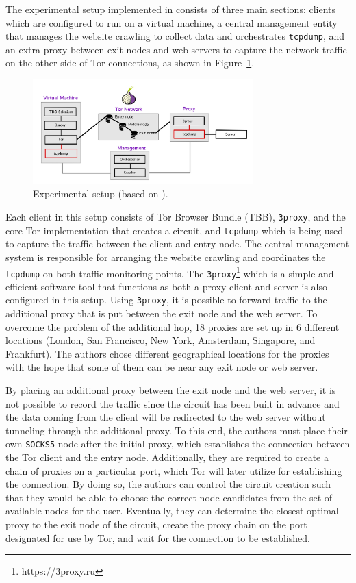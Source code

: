 \documentclass[sigconf]{acmart}
\begin{document}
The experimental setup implemented in \cite{RimmerV} consists of three main sections: clients which are configured to run on a virtual machine, a central management entity that manages the website crawling to collect data and orchestrates \texttt{tcpdump}, and an extra proxy between exit nodes and web servers to capture the network traffic on the other side of Tor connections, as shown in Figure~\ref{fig:5}.

\begin{figure}[h]
  \centering
  \includegraphics[width=8.5cm]{Figure_5.jpg}
 \caption{\textmd{Experimental setup (based on \cite{RimmerV}).}}
 \label{fig:5}
\end{figure}

Each client in this setup consists of Tor Browser Bundle (TBB), \texttt{3proxy}, and the core Tor implementation that creates a circuit, and \texttt{tcpdump} which is being used to capture the traffic between the client and entry node. The central management system is responsible for arranging the website crawling and coordinates the \texttt{tcpdump} on both traffic monitoring points. The \texttt{3proxy}\footnote{https://3proxy.ru} which is a simple and efficient software tool that functions as both a proxy client and server is also configured in this setup. Using \texttt{3proxy}, it is possible to forward traffic to the additional proxy that is put between the exit node and the web server. To overcome the problem of the additional hop, 18 proxies are set up in 6 different locations (London, San Francisco, New York, Amsterdam, Singapore, and Frankfurt). The authors chose different geographical locations for the proxies with the hope that some of them can be near any exit node or web server. 

By placing an additional proxy between the exit node and the web server, it is not possible to record the traffic since the circuit has been built in advance and the data coming from the client will be redirected to the web server without tunneling through the additional proxy. To this end, the authors must place their own \texttt{SOCKS5} node after the initial proxy, which establishes the connection between the Tor client and the entry node. Additionally, they are required to create a chain of proxies on a particular port, which Tor will later utilize for establishing the connection. By doing so, the authors can control the circuit creation such that they would be able to choose the correct node candidates from the set of available nodes for the user. Eventually, they can determine the closest optimal proxy to the exit node of the circuit, create the proxy chain on the port designated for use by Tor, and wait for the connection to be established.
\end{document}
